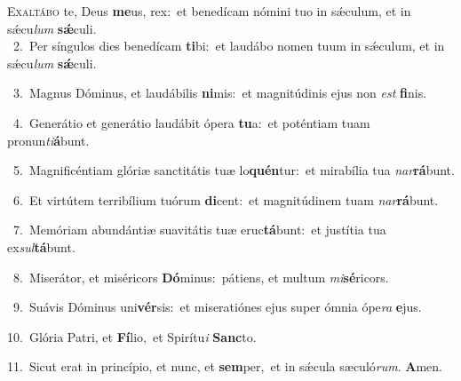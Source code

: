\lettrine{\initial\textcolor{\initialcolor}{E}}{xaltábo} te, Deus \textbf{me}\-us, rex:~\star et benedícam nómini tuo in sǽculum, et in sǽcu\textit{lum} \textbf{sǽ}\-culi.\\
{\numbfont\textcolor{\numbcolor}{~2.}}~Per síngulos dies benedícam \textbf{ti}\-bi:~\star et laudábo nomen tuum in sǽculum, et in sǽcu\textit{lum} \textbf{sǽ}\-culi.\par
{\numbfont\textcolor{\numbcolor}{~3.}}~Magnus Dóminus, et laudábilis \textbf{ni}\-mis:~\star et magnitúdinis ejus non \textit{est} \textbf{fi}\-nis.\par
{\numbfont\textcolor{\numbcolor}{~4.}}~Generátio et generátio laudábit ópera \textbf{tu}\-a:~\star et poténtiam tuam pronun\-\textit{ti}\-\textbf{á}bunt.\par
{\numbfont\textcolor{\numbcolor}{~5.}}~Magnificéntiam glóriæ sanctitátis tuæ lo\-\textbf{quén}\-tur:~\star et mirabília tua \textit{nar}\-\textbf{rá}bunt.\par
{\numbfont\textcolor{\numbcolor}{~6.}}~Et virtútem terribílium tuórum \textbf{di}\-cent:~\star et magnitúdinem tuam \textit{nar}\-\textbf{rá}bunt.\par
{\numbfont\textcolor{\numbcolor}{~7.}}~Memóriam abundántiæ suavitátis tuæ eruc\-\textbf{tá}\-bunt:~\star et justítia tua ex\-\textit{sul}\-\textbf{tá}bunt.\par
{\numbfont\textcolor{\numbcolor}{~8.}}~Miserátor, et miséricors \textbf{Dó}\-minus:~\star pátiens, et multum \textit{mi}\-\textbf{sé}ricors.\par
{\numbfont\textcolor{\numbcolor}{~9.}}~Suávis Dóminus uni\-\textbf{vér}\-sis:~\star et miseratiónes ejus super ómnia ópe\textit{ra} \textbf{e}\-jus.\par
{\numbfont\textcolor{\numbcolor}{10.}}~Glória Patri, et \textbf{Fí}\-lio,~\star et Spirítu\textit{i} \textbf{Sanc}\-to.\par
{\numbfont\textcolor{\numbcolor}{11.}}~Sicut erat in princípio, et nunc, et \textbf{sem}\-per,~\star et in sǽcula sæculó\-\textit{rum}\-. \textbf{A}\-men.\par
